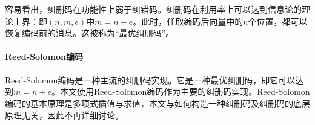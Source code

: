 容易看出，纠删码在功能性上弱于纠错码。纠删码在利用率上可以达到信息论的理论上界：即$(n,m,e)$中$m=n+e$。此时，任取编码后向量中的$n$个位置，都可以恢复编码前的消息。这被称为“最优纠删码”。

\paragraph{Reed-Solomon编码}
Reed-Solomon编码是一种主流的纠删码实现。它是一种最优纠删码，即它可以达到$m=n+e$。本文使用Reed-Solomon编码作为主要的纠删码实现。Reed-Solomon编码的基本原理是多项式插值与求值，本文与如何构造一种纠删码及纠删码的底层原理无关，因此不再详细讨论。
